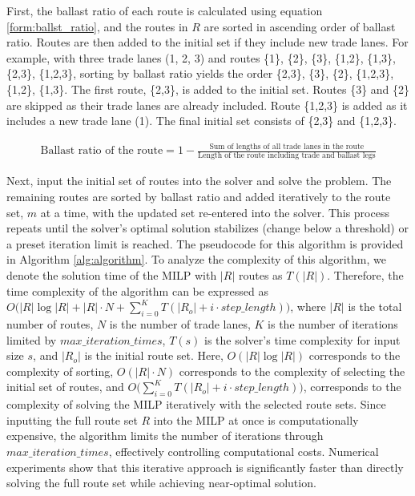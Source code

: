 \documentclass[11pt,english]{article}
\begin{document}
First, the ballast ratio of each route is calculated using equation \eqref{form:ballst_ratio}, and the routes in $R$ are sorted in ascending order of ballast ratio. Routes are then added to the initial set if they include new trade lanes. For example, with three trade lanes (1, 2, 3) and routes \{1\}, \{2\}, \{3\}, \{1,2\}, \{1,3\}, \{2,3\}, \{1,2,3\}, sorting by ballast ratio yields the order \{2,3\}, \{3\}, \{2\}, \{1,2,3\}, \{1,2\}, \{1,3\}. The first route, \{2,3\}, is added to the initial set. Routes \{3\} and \{2\} are skipped as their trade lanes are already included. Route \{1,2,3\} is added as it includes a new trade lane (1). The final initial set consists of \{2,3\} and \{1,2,3\}.

{\small
\begin{align}
    \text{Ballast ratio of the route} = 1 - \frac{\text{Sum of lengths of all trade lanes in the route}}{\text{Length of the route including trade and ballast legs}} \label{form:ballst_ratio}
\end{align}
}

Next, input the initial set of routes into the solver and solve the problem. The remaining routes are sorted by ballast ratio and added iteratively to the route set, $m$ at a time, with the updated set re-entered into the solver. This process repeats until the solver's optimal solution stabilizes (change below a threshold) or a preset iteration limit is reached. The pseudocode for this algorithm is provided in Algorithm \ref{alg:algorithm}. To analyze the complexity of this algorithm, we denote the solution time of the MILP with $|R|$ routes as $T(|R|)$. Therefore, the time complexity of the algorithm can be expressed as $O\Big(|R| \log |R| + |R| \cdot N + \sum_{i=0}^K T(|R_o| + i \cdot step\_length)\Big)$,
where $|R|$ is the total number of routes, $N$ is the number of trade lanes, $K$ is the number of iterations limited by $max\_iteration\_times$, $T(s)$ is the solver's time complexity for input size $s$, and $|R_o|$ is the initial route set. Here, $O(|R| \log |R|)$ corresponds to the complexity of sorting, $O(|R| \cdot N)$ corresponds to the complexity of selecting the initial set of routes, and $O\Big(\sum_{i=0}^K T(|R_o| + i \cdot step\_length)\Big)$, corresponds to the complexity of solving the MILP iteratively with the selected route sets. Since inputting the full route set $R$ into the MILP at once is computationally expensive, the algorithm limits the number of iterations through $max\_iteration\_times$, effectively controlling computational costs. Numerical experiments show that this iterative approach is significantly faster than directly solving the full route set while achieving near-optimal solution.
\end{document}
